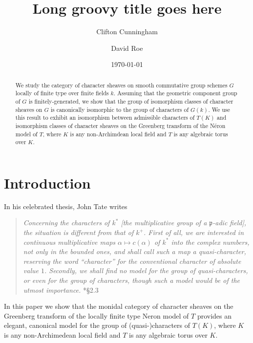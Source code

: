 \documentclass[11pt]{amsart}
\title[Short groovy title goes here]{Long groovy title goes here}
\date{\today}
\author{Clifton Cunningham}
\author{David Roe}
\theoremstyle{plain}
\theoremstyle{definition}
\theoremstyle{remark}
\newcommand{\Fq}{k}
\begin{document}
\begin{abstract}
  We study the category of character sheaves on smooth commutative
  group schemes $G$ locally of finite type over finite fields
  $\Fq$. Assuming that the geometric component group of $G$
  is finitely-generated, we show that the group of isomorphism classes
  of character sheaves on $G$ is canonically isomorphic to the group
  of characters of $G(\Fq)$. We use this result to exhibit an
  isomorphism between admissible characters of $T(K)$ and isomorphism
  classes of character sheaves on the Greenberg transform of the Néron
  model of $T$, where $K$ is any non-Archimdean local field and $T$ is
  any algebraic torus over $K$.
\end{abstract}

\maketitle

\section{Introduction}

%
In his celebrated thesis, John Tate writes 
\begin{quotation}
    {\it Concerning the characters of $k^*$ [the
    multiplicative group of a $\mathfrak{p}$-adic field], the
    situation is different from that of $k^+$.  First of all, we are
    interested in continuous multiplicative maps $\alpha \mapsto
    c(\alpha)$ of $k^*$ into the complex numbers, not only in the
    bounded ones, and shall call such a map a quasi-character,
    reserving the word ``character'' for the conventional character of
    absolute value $1$. Secondly, we shall find no model for the group
    of quasi-characters, or even for the group of characters, though
    such a model would be of the utmost importance.}
  \cite{Tate:thesis}*{\S 2.3}
\end{quotation}
\noindent
In this paper we show that the monidal category of character sheaves
on the Greenberg transform of the locally finite type Neron model of
$T$ provides an elegant, canonical model for the group of
(quasi-)characters of $T(K)$, where $K$ is any non-Archimedean local
field and $T$ is any algebraic torus over $K$.
\end{document}
